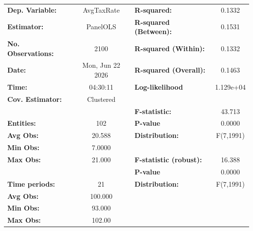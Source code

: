 \begin{center}
\begin{tabular}{lclc}
\toprule
\textbf{Dep. Variable:}                       &     AvgTaxRate     & \textbf{  R-squared:         }   &      0.1332      \\
\textbf{Estimator:}                           &      PanelOLS      & \textbf{  R-squared (Between):}  &      0.1531      \\
\textbf{No. Observations:}                    &        2100        & \textbf{  R-squared (Within):}   &      0.1332      \\
\textbf{Date:}                                &  Mon, Jun 22 2026  & \textbf{  R-squared (Overall):}  &      0.1463      \\
\textbf{Time:}                                &      04:30:11      & \textbf{  Log-likelihood     }   &    1.129e+04     \\
\textbf{Cov. Estimator:}                      &     Clustered      & \textbf{                     }   &                  \\
\textbf{}                                     &                    & \textbf{  F-statistic:       }   &      43.713      \\
\textbf{Entities:}                            &        102         & \textbf{  P-value            }   &      0.0000      \\
\textbf{Avg Obs:}                             &       20.588       & \textbf{  Distribution:      }   &    F(7,1991)     \\
\textbf{Min Obs:}                             &       7.0000       & \textbf{                     }   &                  \\
\textbf{Max Obs:}                             &       21.000       & \textbf{  F-statistic (robust):} &      16.388      \\
\textbf{}                                     &                    & \textbf{  P-value            }   &      0.0000      \\
\textbf{Time periods:}                        &         21         & \textbf{  Distribution:      }   &    F(7,1991)     \\
\textbf{Avg Obs:}                             &      100.000       & \textbf{                     }   &                  \\
\textbf{Min Obs:}                             &       93.000       & \textbf{                     }   &                  \\
\textbf{Max Obs:}                             &       102.00       & \textbf{                     }   &                  \\

\end{tabular}
\end{center}
